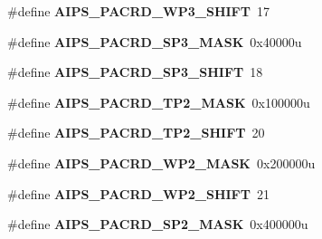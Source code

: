 \begin{DoxyCompactItemize}
\item 
\#define {\bfseries A\+I\+P\+S\+\_\+\+P\+A\+C\+R\+D\+\_\+\+W\+P3\+\_\+\+S\+H\+I\+FT}~17\hypertarget{group__AIPS__Register__Masks_ga390e1a4b40b18a57acafc9b39c0d79f4}{}\label{group__AIPS__Register__Masks_ga390e1a4b40b18a57acafc9b39c0d79f4}

\item 
\#define {\bfseries A\+I\+P\+S\+\_\+\+P\+A\+C\+R\+D\+\_\+\+S\+P3\+\_\+\+M\+A\+SK}~0x40000u\hypertarget{group__AIPS__Register__Masks_ga99ea2f4d69ee7b3c8cd2377b9f56f63e}{}\label{group__AIPS__Register__Masks_ga99ea2f4d69ee7b3c8cd2377b9f56f63e}

\item 
\#define {\bfseries A\+I\+P\+S\+\_\+\+P\+A\+C\+R\+D\+\_\+\+S\+P3\+\_\+\+S\+H\+I\+FT}~18\hypertarget{group__AIPS__Register__Masks_ga534c61c7493422047a9ad34af21e7561}{}\label{group__AIPS__Register__Masks_ga534c61c7493422047a9ad34af21e7561}

\item 
\#define {\bfseries A\+I\+P\+S\+\_\+\+P\+A\+C\+R\+D\+\_\+\+T\+P2\+\_\+\+M\+A\+SK}~0x100000u\hypertarget{group__AIPS__Register__Masks_ga64d283e39d1781d54a3a44b1736f767a}{}\label{group__AIPS__Register__Masks_ga64d283e39d1781d54a3a44b1736f767a}

\item 
\#define {\bfseries A\+I\+P\+S\+\_\+\+P\+A\+C\+R\+D\+\_\+\+T\+P2\+\_\+\+S\+H\+I\+FT}~20\hypertarget{group__AIPS__Register__Masks_ga34c287165d901e8037627e8a6e57a21f}{}\label{group__AIPS__Register__Masks_ga34c287165d901e8037627e8a6e57a21f}

\item 
\#define {\bfseries A\+I\+P\+S\+\_\+\+P\+A\+C\+R\+D\+\_\+\+W\+P2\+\_\+\+M\+A\+SK}~0x200000u\hypertarget{group__AIPS__Register__Masks_gaec091c81e6e47a41d51fd9830e499793}{}\label{group__AIPS__Register__Masks_gaec091c81e6e47a41d51fd9830e499793}

\item 
\#define {\bfseries A\+I\+P\+S\+\_\+\+P\+A\+C\+R\+D\+\_\+\+W\+P2\+\_\+\+S\+H\+I\+FT}~21\hypertarget{group__AIPS__Register__Masks_gaba4accebc864bd50853123fb958ce2a2}{}\label{group__AIPS__Register__Masks_gaba4accebc864bd50853123fb958ce2a2}

\item 
\#define {\bfseries A\+I\+P\+S\+\_\+\+P\+A\+C\+R\+D\+\_\+\+S\+P2\+\_\+\+M\+A\+SK}~0x400000u\hypertarget{group__AIPS__Register__Masks_ga1585ceedbbfaf2dd3fbeaffd269e848c}{}\label{group__AIPS__Register__Masks_ga1585ceedbbfaf2dd3fbeaffd269e848c}


\end{DoxyCompactItemize}
